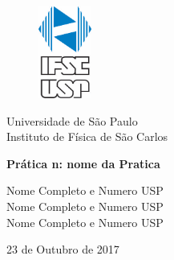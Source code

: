 \documentclass[a4paper, 12pt]{article}
\begin{document}

\begin{titlepage} 

\begin{figure}[H]
\centering
\includegraphics[width=1.75cm]{IFSC_USP.png} %

\end{figure}
    \begin{center}
        Universidade de São Paulo \\
        
        Instituto de Física de São Carlos \\


\vspace{10pt}

        
        \vspace{85pt}
        
        
         \large\textbf{{Prática n: nome da Pratica }} %
        \vspace{160pt}
        
    \end{center}
    
    \begin{flushright}
        
         Nome Completo e Numero USP\\ %
         Nome Completo e Numero USP  \\
            Nome Completo e Numero USP
    \end{flushright}
    
    \begin{center}
        \vspace{\fill}
        23 de Outubro de 2017 %
    \end{center}
\end{titlepage}

\newpage

\thispagestyle{empty}

\newpage
{}

\end{document}
